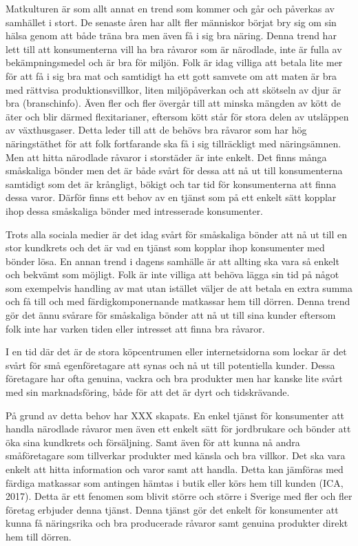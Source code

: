 \documentclass[10pt,a4paper,oneside]{article}
\begin{document}
Matkulturen är som allt annat en trend som kommer och går och påverkas av samhället i stort. De senaste åren har allt fler människor börjat bry sig om sin hälsa genom att både träna bra men även få i sig bra näring. Denna trend har lett till att konsumenterna vill ha bra råvaror som är närodlade, inte är fulla av bekämpningsmedel och är bra för miljön. Folk är idag villiga att betala lite mer för att få i sig bra mat och samtidigt ha ett gott samvete om att maten är bra med rättvisa produktionsvillkor, liten miljöpåverkan och att skötseln av djur är bra (branschinfo). Även fler och fler övergår till att minska mängden av kött de äter och blir därmed flexitarianer, eftersom kött står för stora delen av utsläppen av växthusgaser. Detta leder till att de behövs bra råvaror som har hög näringstäthet för att folk fortfarande ska få i sig tillräckligt med näringsämnen. Men att hitta närodlade råvaror i storstäder är inte enkelt. Det finns många småskaliga bönder men det är både svårt för dessa att nå ut till konsumenterna samtidigt som det är krångligt, bökigt och tar tid för konsumenterna att finna dessa varor. Därför finns ett behov av en tjänst som på ett enkelt sätt kopplar ihop dessa småskaliga bönder med intresserade konsumenter.
 
Trots alla sociala medier är det idag svårt för småskaliga bönder att nå ut till en stor kundkrets och det är vad en tjänst som kopplar ihop konsumenter med bönder lösa. En annan trend i dagens samhälle är att allting ska vara så enkelt och bekvämt som möjligt. Folk är inte villiga att behöva lägga sin tid på något som exempelvis handling av mat utan istället väljer de att betala en extra summa och få till och med färdigkomponernande matkassar hem till dörren. Denna trend gör det ännu svårare för småskaliga bönder att nå ut till sina kunder eftersom folk inte har varken tiden eller intresset att finna bra råvaror.

I en tid där det är de stora köpcentrumen eller internetsidorna som lockar är det svårt för små egenföretagare att synas och nå ut till potentiella kunder. Dessa företagare har ofta genuina, vackra och bra produkter men har kanske lite svårt med sin marknadsföring, både för att det är dyrt och tidskrävande. 
 
På grund av detta behov har XXX skapats. En enkel tjänst för konsumenter att handla närodlade råvaror men även ett enkelt sätt för jordbrukare och bönder att öka sina kundkrets och försäljning. Samt även för att kunna nå andra småföretagare som tillverkar produkter med känsla och bra villkor. Det ska vara enkelt att hitta information och varor samt att handla. Detta kan jämföras med färdiga matkassar som antingen hämtas i butik eller körs hem till kunden (ICA, 2017). Detta är ett fenomen som blivit större och större i Sverige med fler och fler företag erbjuder denna tjänst. Denna tjänst gör det enkelt för konsumenter att kunna få näringsrika och bra producerade råvaror samt genuina produkter direkt hem till dörren. 
\end{document}
